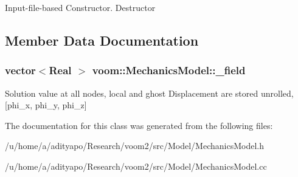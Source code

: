 Input-\/file-\/based Constructor. Destructor 

\subsection{Member Data Documentation}
\hypertarget{classvoom_1_1_mechanics_model_a0c96adf9c1e07f5b604a3db9ffe9b750}{
\subsubsection[{\_\-field}]{\setlength{\rightskip}{0pt plus 5cm}vector$<$Real $>$ {\bf voom::MechanicsModel::\_\-field}}}
\label{classvoom_1_1_mechanics_model_a0c96adf9c1e07f5b604a3db9ffe9b750}
Solution value at all nodes, local and ghost Displacement are stored unrolled, \mbox{[}phi\_\-x, phi\_\-y, phi\_\-z\mbox{]} 

The documentation for this class was generated from the following files:\begin{DoxyCompactItemize}
\item 
/u/home/a/adityapo/Research/voom2/src/Model/MechanicsModel.h\item 
/u/home/a/adityapo/Research/voom2/src/Model/MechanicsModel.cc\end{DoxyCompactItemize}
